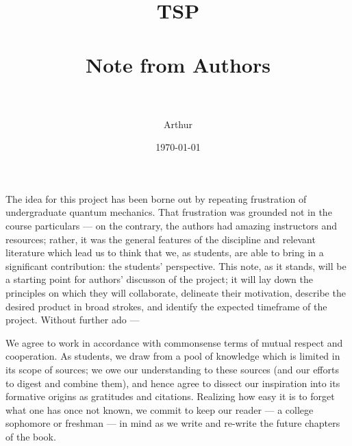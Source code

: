 \documentclass[paper=letterpaper, fontsize=11pt]{article} %
\title{	
\normalfont \normalsize 
\textsc{TSP} \\ [25pt] %
\horrule{0.5pt} \\[0.4cm] %
\huge Note from Authors \\ %
\horrule{2pt} \\[0.5cm] %
}
\author{Arthur} %
\date{\normalsize\today} %
\numberwithin{equation}{section} %
\numberwithin{figure}{section} %
\numberwithin{table}{section} %
\begin{document}
\maketitle %





\par The idea for this project has been borne out by repeating frustration of undergraduate quantum mechanics. That frustration was grounded not in the course particulars --- on the contrary, the authors had amazing instructors and resources; rather, it was the general features of the discipline and relevant literature which lead us to think that we, as students, are able to bring in a significant contribution: the students' perspective. This note, as it stands, will be a starting point for authors' discusson of the project; it will lay down the principles on which they will collaborate, delineate their motivation, describe the desired product in broad strokes, and identify the expected timeframe of the project. Without further ado ---

\par We agree to work in accordance with commonsense terms of mutual respect and cooperation. As students, we draw from a pool of knowledge which is limited in its scope of sources; we owe our understanding to these sources (and our efforts to digest and combine them), and hence agree to dissect our inspiration into its formative origins as gratitudes and citations. Realizing how easy it is to forget what one has once not known, we commit to keep our reader --- a college sophomore or freshman --- in mind as we write and re-write the future chapters of the book.
\end{document}
